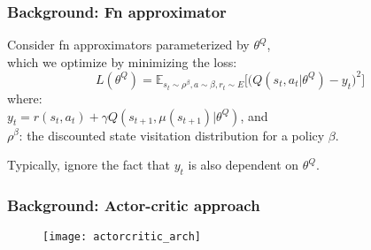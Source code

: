 \begin{frame}
\frametitle{Background: Fn approximator}
Consider fn approximators parameterized by $\theta^Q$, \\
which we optimize by minimizing the loss:
\begin{equation} \label{equ:qloss}
L(\theta^Q) =\mathbb{E}_{s_t \sim \rho^{\beta}, a \sim \beta, r_t \sim E} \Big[ \Big( Q (s_t,a_t|\theta^Q) - y_t \Big)^2 \Big]
\end{equation}
where:\\
$y_t = r(s_t,a_t) + \gamma Q(s_{t+1},\mu(s_{t+1}) | \theta^Q)$, and \\
$\rho^{\beta}$: the discounted state visitation distribution for a policy $\beta$.
\vspace{5mm}

Typically, ignore the fact that $y_t$ is also dependent on $\theta^Q$.\\
\end{frame}

\begin{frame}
\frametitle{Background: Actor-critic approach}
\begin{figure}
    \centering
    \texttt{[image: actorcritic\_arch]}
\end{figure}
\end{frame}


